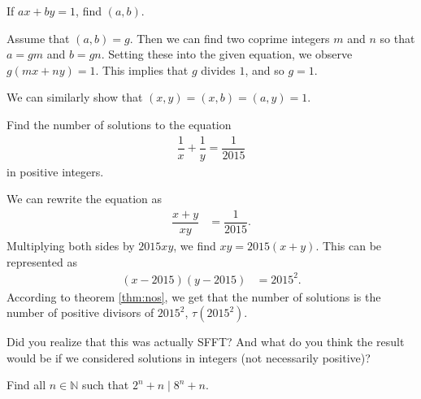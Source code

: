 \documentclass{subfile}
\begin{document}
		\begin{problem}
			If $ax+by=1$, find $(a,b)$.\label{prob:d1}
		\end{problem}

		\begin{solution}
			Assume that $(a,b)=g$. Then we can find two coprime integers $m$ and $n$ so that $a=gm$ and $b=gn$. Setting these into the given equation, we observe $g(mx+ny)=1$. This implies that $g$ divides $1$, and so $g=1$.
		\end{solution}

		\begin{note}
			We can similarly show that $(x,y)=(x,b)=(a,y)=1$.
		\end{note}

		\begin{problem}
			Find the number of solutions to the equation
			\begin{align*}
				\dfrac{1}{x}+\dfrac{1}{y}=\dfrac{1}{2015}
			\end{align*}
			in positive integers.
		\end{problem}

		\begin{solution}
			We can rewrite the equation as
				\begin{align*}
					\dfrac{x+y}{xy} & = \dfrac{1}{2015}.
				\end{align*}
			Multiplying both sides by $2015xy$, we find $xy=2015(x+y)$. This can be represented as
				\begin{align*}
					(x-2015)(y-2015) & = 2015^2.
				\end{align*}
			According to theorem \eqref{thm:nos}, we get that the number of solutions is the number of positive divisors of $2015^2$, $\tau(2015^2)$.
		\end{solution}

		\begin{note}
			Did you realize that this was actually SFFT? And what do you think the result would be if we considered solutions in integers (not necessarily positive)?
		\end{note}

		\begin{problem}
			Find all $n\in\mathbb{N}$ such that $2^n+n\mid 8^n+n$.
		\end{problem}
\end{document}
